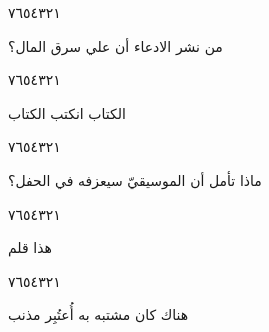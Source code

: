 \documentclass[11pt, a4paper]{article}
\begin{document}
{\begin{center}
        \hfill\textarabic{٧}\hfill\textarabic{٦}\hfill\textarabic{٥}\hfill\textarabic{٤}\hfill\textarabic{٣}\hfill\textarabic{٢}\hfill\textarabic{١}
        \end{center}


\vspace{0.5\baselineskip}\begin{flushright}
\textarabic{من نشر الادعاء أن علي سرق المال؟}
\end{flushright}

\begin{center}
        \hfill\textarabic{٧}\hfill\textarabic{٦}\hfill\textarabic{٥}\hfill\textarabic{٤}\hfill\textarabic{٣}\hfill\textarabic{٢}\hfill\textarabic{١}
        \end{center}


\vspace{0.5\baselineskip}\begin{flushright}
\textarabic{الكتاب انكتب الكتاب}
\end{flushright}

\begin{center}
        \hfill\textarabic{٧}\hfill\textarabic{٦}\hfill\textarabic{٥}\hfill\textarabic{٤}\hfill\textarabic{٣}\hfill\textarabic{٢}\hfill\textarabic{١}
        \end{center}


\vspace{0.5\baselineskip}\begin{flushright}
\textarabic{ماذا تأمل أن الموسيقيّ سيعزفه في الحفل؟}
\end{flushright}

\begin{center}
        \hfill\textarabic{٧}\hfill\textarabic{٦}\hfill\textarabic{٥}\hfill\textarabic{٤}\hfill\textarabic{٣}\hfill\textarabic{٢}\hfill\textarabic{١}
        \end{center}


\vspace{0.5\baselineskip}\begin{flushright}
\textarabic{هذا قلم}
\end{flushright}

\begin{center}
        \hfill\textarabic{٧}\hfill\textarabic{٦}\hfill\textarabic{٥}\hfill\textarabic{٤}\hfill\textarabic{٣}\hfill\textarabic{٢}\hfill\textarabic{١}
        \end{center}


\vspace{0.5\baselineskip}\begin{flushright}
\textarabic{هناك كان مشتبه به أُعتُبِر مذنب}
\end{flushright}

}
\end{document}
